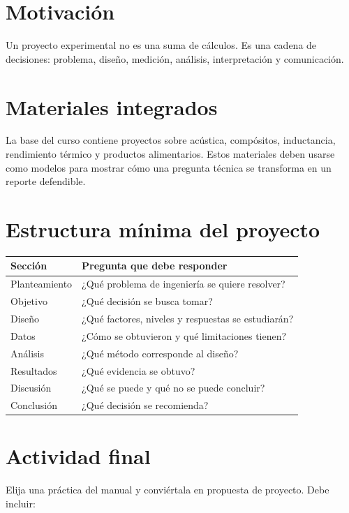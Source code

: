 
\section{Motivación}

Un proyecto experimental no es una suma de cálculos. Es una cadena de decisiones: problema, diseño, medición, análisis, interpretación y comunicación.

\section{Materiales integrados}

La base del curso contiene proyectos sobre acústica, compósitos, inductancia, rendimiento térmico y productos alimentarios. Estos materiales deben usarse como modelos para mostrar cómo una pregunta técnica se transforma en un reporte defendible.

\section{Estructura mínima del proyecto}

\begin{longtable}{p{}p{}}
\toprule
Sección & Pregunta que debe responder\\
\midrule
Planteamiento & ¿Qué problema de ingeniería se quiere resolver?\\
Objetivo & ¿Qué decisión se busca tomar?\\
Diseño & ¿Qué factores, niveles y respuestas se estudiarán?\\
Datos & ¿Cómo se obtuvieron y qué limitaciones tienen?\\
Análisis & ¿Qué método corresponde al diseño?\\
Resultados & ¿Qué evidencia se obtuvo?\\
Discusión & ¿Qué se puede y qué no se puede concluir?\\
Conclusión & ¿Qué decisión se recomienda?\\
\bottomrule
\end{longtable}

\section{Actividad final}

Elija una práctica del manual y conviértala en propuesta de proyecto. Debe incluir:

